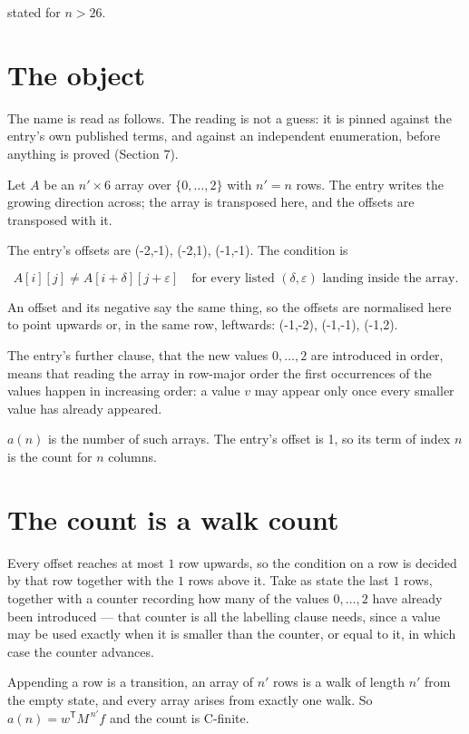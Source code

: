 \documentclass[11pt]{article}
\theoremstyle{definition}
\begin{document}
stated for $n > 26$.

\section{The object}

The name is read as follows. The reading is not a guess: it is pinned against the entry's own published terms, and against an independent enumeration, before anything is proved (Section 7).

Let $A$ be an $n' \times 6$ array over $\{0,\dots,2\}$ with $n' = n$ rows. The entry writes the growing direction across; the array is transposed here, and the offsets are transposed with it.

The entry's offsets are (-2,-1), (-2,1), (-1,-1). The condition is

\[A[i][j] \ne A[i{+}\delta][j{+}\varepsilon]\quad\text{for every listed }(\delta,\varepsilon)\text{ landing inside the array.}\]

An offset and its negative say the same thing, so the offsets are normalised here to point upwards or, in the same row, leftwards: (-1,-2), (-1,-1), (-1,2).

The entry's further clause, that the new values $0,\dots,2$ are introduced in order, means that reading the array in row-major order the first occurrences of the values happen in increasing order: a value $v$ may appear only once every smaller value has already appeared.

$a(n)$ is the number of such arrays. The entry's offset is 1, so its term of index $n$ is the count for $n$ columns.

\section{The count is a walk count}

Every offset reaches at most $1$ row upwards, so the condition on a row is decided by that row together with the $1$ rows above it. Take as state the last $1$ rows, together with a counter recording how many of the values $0,\dots,2$ have already been introduced --- that counter is all the labelling clause needs, since a value may be used exactly when it is smaller than the counter, or equal to it, in which case the counter advances.

Appending a row is a transition, an array of $n'$ rows is a walk of length $n'$ from the empty state, and every array arises from exactly one walk. So $a(n) = w^{\mathsf T}M^{\,n'}f$ and the count is C-finite.
\end{document}

